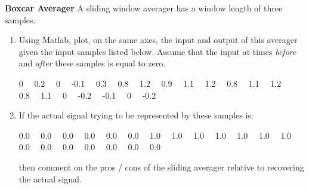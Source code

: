 \item {\bf Boxcar Averager} A sliding window averager has a window length of
three samples.  

\begin{enumerate}
\item Using Matlab, plot, on the same axes, the input and output of
this averager given the input samples listed below. Assume that the input at
times \textit{before} and \textit{after} these samples is equal to zero. \\

\centerline{0~~ 0.2~~ 0~~ -0.1~~ 0.3~~ 0.8~~ 1.2~~ 0.9~~ 1.1~~ 1.2~~ 0.8~~ 1.1~~ 1.2~~ 0.8~~ 1.1~~ 0~~ -0.2~~ -0.1~~ 0~~ -0.2~~}

\item If the actual signal trying to be represented by these samples is: \\

\centerline{0.0~~ 0.0~~ 0.0~~ 0.0~~ 0.0~~ 0.0~~ 1.0~~ 1.0~~ 1.0~~ 1.0~~ 1.0~~ 1.0~~ 1.0~~ 0.0~~ 0.0~~ 0.0~~ 0.0~~ 0.0~~ 0.0~~ 0.0~~}

then comment on the pros / cons of the sliding averager relative to recovering
the actual signal.
\end{enumerate}
